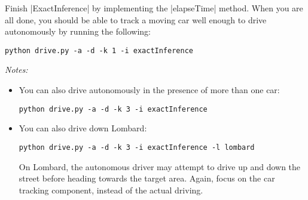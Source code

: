 \item {}
Finish |ExactInference| by implementing the |elapseTime| method. When you are
all done, you should be able to track a moving car well enough to drive
autonomously by running the following:

\begin{lstlisting}
python drive.py -a -d -k 1 -i exactInference
\end{lstlisting}

{\em Notes:
\begin{itemize}
  \item You can also drive autonomously in the presence of more than one car:
\begin{lstlisting}
python drive.py -a -d -k 3 -i exactInference
\end{lstlisting}

  \item You can also drive down Lombard:
\begin{lstlisting}
python drive.py -a -d -k 3 -i exactInference -l lombard
\end{lstlisting}

  On Lombard, the autonomous driver may attempt to drive up and down the street
  before heading towards the target area. Again, focus on the car tracking
  component, instead of the actual driving.
\end{itemize}
}